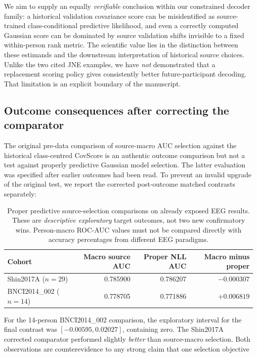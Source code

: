We aim to supply an equally \emph{verifiable} conclusion
within our constrained decoder family: a historical
validation covariance score can be misidentified as
source-trained class-conditional predictive likelihood,
and even a correctly computed Gaussian score can be
dominated by source validation shifts invisible to
a fixed within-person rank metric.
The scientific value lies in the distinction
between these estimands and the downstream
interpretation of historical source choices.
Unlike the two cited JNE examples, we have
\emph{not} demonstrated that a replacement
scoring policy gives consistently better
future-participant decoding. That limitation
is an explicit boundary of the manuscript.

\subsection{Outcome consequences after correcting the comparator}
\label{sec:p1-correct-comparator-decision}
The original pre-data comparison of source-macro
AUC selection against the historical class-centred
CovScore is an authentic outcome comparison but
not a test against properly predictive Gaussian
model selection. The latter evaluation was
specified after earlier outcomes had been read.
To prevent an invalid upgrade of the original
test, we report the corrected post-outcome
matched contrasts separately:
\begin{table}[tb]
\centering\small
\caption{Proper predictive source-selection
comparisons on already exposed EEG results.
These are \emph{descriptive exploratory}
target outcomes, not two new confirmatory wins.
Person-macro ROC-AUC values must not be
compared directly with accuracy percentages
from different EEG paradigms.}
\label{tab:p1-correct-predictive}
\begin{tabular}{lrrr}
\toprule
Cohort & Macro source AUC & Proper NLL AUC &
Macro minus proper\\
\midrule
Shin2017A ($n=29$) &0.785900&0.786207&$-0.000307$\\
BNCI2014\_002 ($n=14$) &0.778705&0.771886&$+0.006819$\\
\bottomrule
\end{tabular}
\end{table}
For the 14-person BNCI2014\_002 comparison,
the exploratory interval for the final contrast
was $[-0.00595,0.02027]$, containing zero.
The Shin2017A corrected comparator performed
slightly \emph{better} than source-macro
selection. Both observations are counterevidence
to any strong claim that one selection objective
